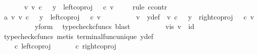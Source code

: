 \begin{isabellebody}
\ \ \ \ \isamarkupfalse%
\ {\isachardoublequoteopen}{\isasymexists}\ v{\isachardot}{\kern0pt}\ v\ {\isasymin}\isactrlsub c\ {\isasymone}\ {\isasymand}\ y\ {\isacharequal}{\kern0pt}\ left{\isacharunderscore}{\kern0pt}coproj\ {\isasymone}\ {\isasymone}\ {\isasymcirc}\isactrlsub c\ v{\isachardoublequoteclose}\isanewline
\ \ \ \ \isamarkupfalse%
{\isacharparenleft}{\kern0pt}rule\ ccontr{\isacharparenright}{\kern0pt}\isanewline
\ \ \ \ \ \ \isamarkupfalse%
\ a{}{\isacharcolon}{\kern0pt}\ {\isachardoublequoteopen}{\isasymnexists}v{\isachardot}{\kern0pt}\ v\ {\isasymin}\isactrlsub c\ {\isasymone}\ {\isasymand}\ y\ {\isacharequal}{\kern0pt}\ left{\isacharunderscore}{\kern0pt}coproj\ {\isasymone}\ {\isasymone}\ {\isasymcirc}\isactrlsub c\ v{\isachardoublequoteclose}\isanewline
\ \ \ \ \ \ \isamarkupfalse%
\ \isamarkupfalse%
\ v\ \ y{\isacharunderscore}{\kern0pt}def{\isacharcolon}{\kern0pt}\ \ {\isachardoublequoteopen}v\ {\isasymin}\isactrlsub c\ {\isasymone}\ {\isasymand}\ y\ {\isacharequal}{\kern0pt}\ right{\isacharunderscore}{\kern0pt}coproj\ {\isasymone}\ {\isasymone}\ {\isasymcirc}\isactrlsub c\ v{\isachardoublequoteclose}\isanewline
\ \ \ \ \ \ \ \ \isamarkupfalse%
\ y{\isacharunderscore}{\kern0pt}form\ \isamarkupfalse%
\ {\isacharparenleft}{\kern0pt}typecheck{\isacharunderscore}{\kern0pt}cfuncs{\isacharcomma}{\kern0pt}\ blast{\isacharparenright}{\kern0pt}\isanewline
\ \ \ \ \ \ \isamarkupfalse%
\ \isamarkupfalse%
\ v{\isacharunderscore}{\kern0pt}is{\isacharcolon}{\kern0pt}\ {\isachardoublequoteopen}v\ {\isacharequal}{\kern0pt}\ id{\isacharparenleft}{\kern0pt}{\isasymone}{\isacharparenright}{\kern0pt}{\isachardoublequoteclose}\isanewline
\ \ \ \ \ \ \ \ \isamarkupfalse%
\ {\isacharparenleft}{\kern0pt}typecheck{\isacharunderscore}{\kern0pt}cfuncs{\isacharcomma}{\kern0pt}\ metis\ terminal{\isacharunderscore}{\kern0pt}func{\isacharunderscore}{\kern0pt}unique\ y{\isacharunderscore}{\kern0pt}def{\isacharparenright}{\kern0pt}\isanewline
\ \ \ \ \ \ \isamarkupfalse%
\ \isamarkupfalse%
\ {\isachardoublequoteopen}{\isasymlangle}{\isasymt}{\isacharcomma}{\kern0pt}{\isasymf}{\isasymrangle}\ {\isasymamalg}\ {\isasymlangle}{\isasymf}{\isacharcomma}{\kern0pt}{\isasymt}{\isasymrangle}\ {\isasymcirc}\isactrlsub c\ left{\isacharunderscore}{\kern0pt}coproj\ {\isasymone}\ {\isasymone}\ {\isacharequal}{\kern0pt}\ {\isasymlangle}{\isasymt}{\isacharcomma}{\kern0pt}{\isasymf}{\isasymrangle}\ {\isasymamalg}\ {\isasymlangle}{\isasymf}{\isacharcomma}{\kern0pt}{\isasymt}{\isasymrangle}\ {\isasymcirc}\isactrlsub c\ right{\isacharunderscore}{\kern0pt}coproj\ {\isasymone}\ {\isasymone}{\isachardoublequoteclose}\isanewline

\end{isabellebody}
